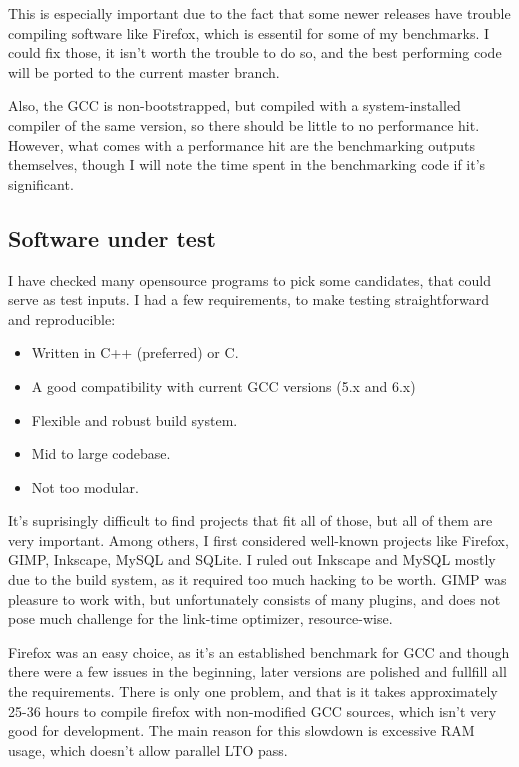 This is especially important due to the fact that some newer releases have
trouble compiling software like Firefox, which is essentil for some of my
benchmarks. I could fix those, it isn't worth the trouble to do so, and the best
performing code will be ported to the current master branch.

Also, the GCC is non-bootstrapped, but compiled with a system-installed compiler
of the same version, so there should be little to no performance hit. However,
what comes with a performance hit are the benchmarking outputs themselves,
though I will note the time spent in the benchmarking code if it's significant.

\subsection{Software under test}

I have checked many opensource programs to pick some candidates, that could
serve as test inputs. I had a few requirements, to make testing straightforward
and reproducible:

\begin{itemize}
	\item Written in C++ (preferred) or C.
	\item A good compatibility with current GCC versions (5.x and 6.x)
	\item Flexible and robust build system.
	\item Mid to large codebase.
	\item Not too modular.
\end{itemize}

It's suprisingly difficult to find projects that fit all of those, but all of
them are very important. Among others, I first considered well-known projects
like Firefox, GIMP, Inkscape, MySQL and SQLite. I ruled out Inkscape and MySQL
mostly due to the build system, as it required too much hacking to be worth.
GIMP was pleasure to work with, but unfortunately consists of many plugins, and
does not pose much challenge for the link-time optimizer, resource-wise.


Firefox was an easy choice, as it's an established benchmark for GCC and though
there were a few issues in the beginning, later versions are polished and
fullfill all the requirements. There is only one problem, and that is it takes
approximately 25-36 hours to compile firefox with non-modified GCC sources,
which isn't very good for development. The main reason for this slowdown is
excessive RAM usage, which doesn't allow parallel LTO pass.

